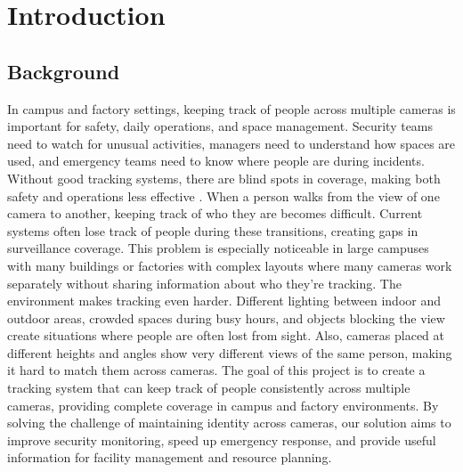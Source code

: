 \newcommand{\persona}[4]{%
    \textbf{#1}
    \small\begin{tabular}[t]{|p{.8in} | p{1.5in}|}
        \hline
        \textbf{Preferences} & #2 \\\hline
        \textbf{Pain Points} & #3 \\\hline
        \textbf{Goals} & #4 \\
        \hline
    \end{tabular}
    \vspace{4pt}
}


\chapter{Introduction}
\label{chap:introduction}

\section{Background}
\label{section:background}

In campus and factory settings, keeping track of people across multiple cameras is important for safety, daily operations, and space management. Security teams need to watch for unusual activities, managers need to understand how spaces are used, and emergency teams need to know where people are during incidents. Without good tracking systems, there are blind spots in coverage, making both safety and operations less effective \cite{wangetal:2021}.
When a person walks from the view of one camera to another, keeping track of who they are becomes difficult. Current systems often lose track of people during these transitions, creating gaps in surveillance coverage. This problem is especially noticeable in large campuses with many buildings or factories with complex layouts where many cameras work separately without sharing information about who they're tracking.
The environment makes tracking even harder. Different lighting between indoor and outdoor areas, crowded spaces during busy hours, and objects blocking the view create situations where people are often lost from sight. Also, cameras placed at different heights and angles show very different views of the same person, making it hard to match them across cameras.
The goal of this project is to create a tracking system that can keep track of people consistently across multiple cameras, providing complete coverage in campus and factory environments. By solving the challenge of maintaining identity across cameras, our solution aims to improve security monitoring, speed up emergency response, and provide useful information for facility management and resource planning.

